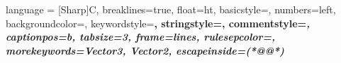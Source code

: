  {
	language = [Sharp]C,
        breaklines=true,
	float=ht, %
	basicstyle=\ssmall, 	%
	numbers=left,                   %
	backgroundcolor=\color{yellow!25},      %
	keywordstyle=\color[rgb]{0,0,0.95}\bfseries, 				%
	stringstyle=\color[rgb]{0.627,0.126,0.941}\bfseries, 			%
	commentstyle=\color[rgb]{0.12, 0.48, 0.18}\bfseries\itshape, 	%
	captionpos=b, tabsize=3,
	frame=lines,
	rulesepcolor=\color{black},
	morekeywords={Vector3, Vector2},	%
	escapeinside={(*@}{@*)}	%
}
